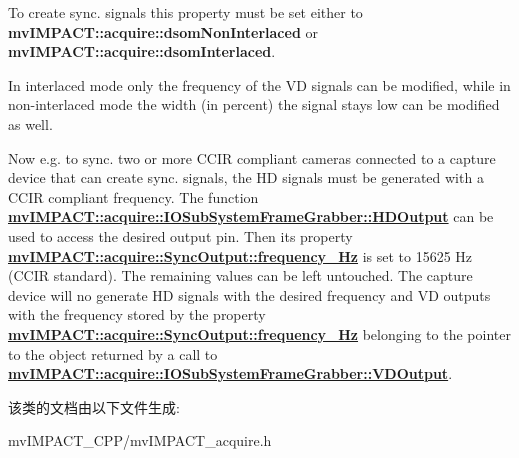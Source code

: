 To create sync. signals this property must be set either to {\bfseries mv\+I\+M\+P\+A\+C\+T\+::acquire\+::dsom\+Non\+Interlaced} or {\bfseries mv\+I\+M\+P\+A\+C\+T\+::acquire\+::dsom\+Interlaced}.

In interlaced mode only the frequency of the V\+D signals can be modified, while in non-\/interlaced mode the width (in percent) the signal stays low can be modified as well.

Now e.\+g. to sync. two or more C\+C\+I\+R compliant cameras connected to a capture device that can create sync. signals, the H\+D signals must be generated with a C\+C\+I\+R compliant frequency. The function {\bfseries \hyperlink{classmv_i_m_p_a_c_t_1_1acquire_1_1_i_o_sub_system_frame_grabber_a281e839ea8d063a199c09ca51641eeaf}{mv\+I\+M\+P\+A\+C\+T\+::acquire\+::\+I\+O\+Sub\+System\+Frame\+Grabber\+::\+H\+D\+Output}} can be used to access the desired output pin. Then its property {\bfseries \hyperlink{classmv_i_m_p_a_c_t_1_1acquire_1_1_sync_output_af2b6f87408372fde91f190f8ef312e45}{mv\+I\+M\+P\+A\+C\+T\+::acquire\+::\+Sync\+Output\+::frequency\+\_\+\+Hz}} is set to 15625 Hz (C\+C\+I\+R standard). The remaining values can be left untouched. The capture device will no generate H\+D signals with the desired frequency and V\+D outputs with the frequency stored by the property {\bfseries \hyperlink{classmv_i_m_p_a_c_t_1_1acquire_1_1_sync_output_af2b6f87408372fde91f190f8ef312e45}{mv\+I\+M\+P\+A\+C\+T\+::acquire\+::\+Sync\+Output\+::frequency\+\_\+\+Hz}} belonging to the pointer to the object returned by a call to {\bfseries \hyperlink{classmv_i_m_p_a_c_t_1_1acquire_1_1_i_o_sub_system_frame_grabber_aa68fc4dacd234e7a0ae41210b26baf4d}{mv\+I\+M\+P\+A\+C\+T\+::acquire\+::\+I\+O\+Sub\+System\+Frame\+Grabber\+::\+V\+D\+Output}}. 

该类的文档由以下文件生成\+:\begin{DoxyCompactItemize}
\item 
mv\+I\+M\+P\+A\+C\+T\+\_\+\+C\+P\+P/mv\+I\+M\+P\+A\+C\+T\+\_\+acquire.\+h\end{DoxyCompactItemize}
